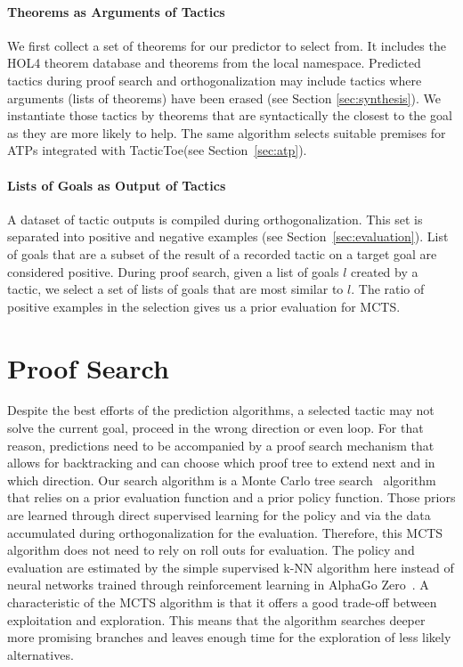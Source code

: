 \documentclass[runningheads,a4paper,draft]{svjour3}
\def\holfour{\textsf{HOL4}\xspace}
\def\tactictoe{\textsf{TacticToe}\xspace}
\begin{document}
\paragraph{Theorems as Arguments of Tactics}
We first collect a set of theorems for our predictor to select from.
It includes the \holfour theorem database and theorems from the local namespace.
Predicted tactics during proof search and orthogonalization may include
tactics where arguments (lists of theorems) have been erased (see Section
\ref{sec:synthesis}).
We instantiate those tactics by theorems that are syntactically the closest to
the goal as they are more likely to help.
The same algorithm selects suitable premises for ATPs integrated with
\tactictoe (see Section~\ref{sec:atp}).

\paragraph{Lists of Goals as Output of Tactics}
A dataset of tactic outputs is compiled during orthogonalization.
This set is separated into positive and negative examples (see
Section~\ref{sec:evaluation}).
List of goals that are a subset of the result of a recorded tactic on a
target goal are considered positive. During proof search, given a list of
goals $l$ created by a tactic, we select a set of lists of goals that are most
similar to $l$. The ratio of positive examples in the selection gives us a
prior evaluation for MCTS.

\section{Proof Search}\label{sec:proofsearch}

Despite the best efforts of the prediction algorithms, a selected tactic may
not solve the current goal, proceed in the wrong direction
or even loop. For that reason, predictions need to be accompanied by a
proof search mechanism that allows for backtracking and
can choose which proof tree to extend next and in which direction.
Our search algorithm is a Monte Carlo tree search~\cite{montecarlo} algorithm
that relies
on a prior evaluation function and a prior policy function. Those priors are
learned through direct supervised learning for the policy and via the data
accumulated during orthogonalization for the evaluation. Therefore, this MCTS
algorithm does not need to rely on roll outs for evaluation. The
policy and evaluation are estimated by the simple supervised k-NN algorithm
here instead of neural networks trained through reinforcement learning in
AlphaGo Zero~\cite{silver2017mastering}.
A characteristic of the MCTS algorithm is that it offers a good trade-off
between exploitation and exploration. This means that the algorithm searches
deeper more promising branches and leaves enough time for the exploration
of less likely alternatives.
\end{document}

